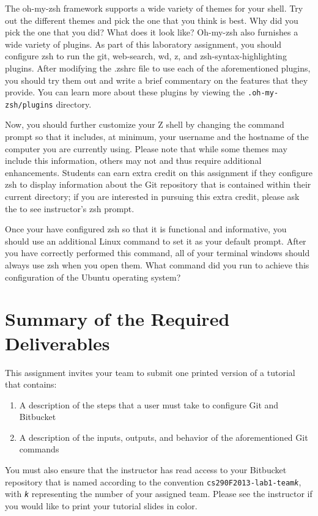 The oh-my-zsh framework supports a wide variety of themes for your shell.  Try out the different themes and pick the one that you
think is best.  Why did you pick the one that you did? What does it look like? Oh-my-zsh also furnishes a wide variety of plugins.
As part of this laboratory assignment, you should configure zsh to run the git, web-search, wd, z, and zsh-syntax-highlighting
plugins.  After modifying the .zshrc file to use each of the aforementioned plugins, you should try them out and write a brief
commentary on the features that they provide. You can learn more about these plugins by viewing the {\tt .oh-my-zsh/plugins}
directory.

Now, you should further customize your Z shell by changing the command prompt so that it includes, at minimum, your username and
the hostname of the computer you are currently using.  Please note that while some themes may include this information, others may
not and thus require additional enhancements.  Students can earn extra credit on this assignment if they configure zsh to display
information about the Git repository that is contained within their current directory; if you are interested in pursuing this
extra credit, please ask the to see instructor's zsh prompt.

Once your have configured zsh so that it is functional and informative, you should use an additional Linux command to set it as
your default prompt.  After you have correctly performed this command, all of your terminal windows should always use zsh when you
open them.  What command did you run to achieve this configuration of the Ubuntu operating system?


\section*{Summary of the Required Deliverables}

This assignment invites your team to submit one printed version of a tutorial that contains:

\begin{enumerate}
	
	\item A description of the steps that a user must take to configure Git and Bitbucket

	\item A description of the inputs, outputs, and behavior of the aforementioned Git commands

\end{enumerate}

You must also ensure that the instructor has read access to your Bitbucket repository that is named according to the
convention {\tt cs290F2013-lab1-team{\em k}}, with {\tt {\em k}} representing the number of your assigned team. Please
see the instructor if you would like to print your tutorial slides in color.


